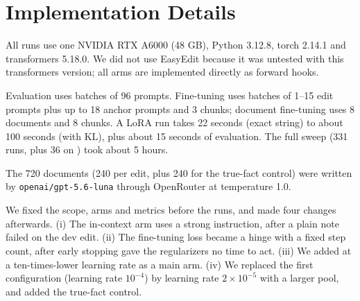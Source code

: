 \section{Implementation Details}
\label{sec:app_repro}

All runs use one NVIDIA RTX A6000 (48 GB), Python 3.12.8, torch 2.14.1 and transformers 5.18.0.
We did not use EasyEdit \citep{zhang2024knowedit} because it was untested with this transformers version; all arms are implemented directly as forward hooks.

Evaluation uses batches of 96 prompts.
Fine-tuning uses batches of 1--15 edit prompts plus up to 18 anchor prompts and 3 \wikitext chunks; document fine-tuning uses 8 documents and 8 \wikitext chunks.
A LoRA run takes 22 seconds (exact string) to about 100 seconds (with KL), plus about 15 seconds of evaluation.
The full \llamashort sweep (331 runs, plus 36 on \qwenshort) took about 5 hours.

The 720 documents (240 per edit, plus 240 for the true-fact control) were written by \texttt{openai/gpt-5.6-luna} through OpenRouter at temperature 1.0.

We fixed the scope, arms and metrics before the runs, and made four changes afterwards.
(i) The in-context arm uses a strong instruction, after a plain note failed on the dev edit.
(ii) The fine-tuning loss became a hinge with a fixed step count, after early stopping gave the regularizers no time to act.
(iii) We added \loraexact at a ten-times-lower learning rate as a main arm.
(iv) We replaced the first \sdf configuration (learning rate $10^{-4}$) by learning rate $2\times10^{-5}$ with a larger \wikitext pool, and added the true-fact control.
